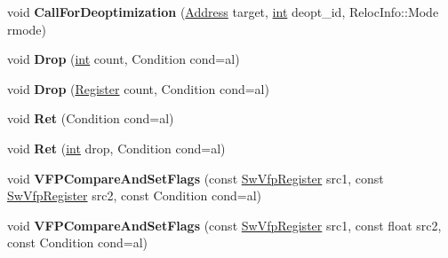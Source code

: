 \begin{DoxyCompactItemize}
\mbox{\label{classv8_1_1internal_1_1TurboAssembler_a8fe9aeaba65f21a5f48bbf9ad66fa18d}} 
void {\bfseries Call\+For\+Deoptimization} (\mbox{\hyperlink{classuintptr__t}{Address}} target, \mbox{\hyperlink{classint}{int}} deopt\+\_\+id, Reloc\+Info\+::\+Mode rmode)
\item 
\mbox{\label{classv8_1_1internal_1_1TurboAssembler_a4eed555cf6760d468febbb6768735945}} 
void {\bfseries Drop} (\mbox{\hyperlink{classint}{int}} count, Condition cond=al)
\item 
\mbox{\label{classv8_1_1internal_1_1TurboAssembler_acbb1403d5c730fde06924e028bdc37ab}} 
void {\bfseries Drop} (\mbox{\hyperlink{classv8_1_1internal_1_1Register}{Register}} count, Condition cond=al)
\item 
\mbox{\label{classv8_1_1internal_1_1TurboAssembler_a04ed6b0bb5c77c06042c60984db0e8a5}} 
void {\bfseries Ret} (Condition cond=al)
\item 
\mbox{\label{classv8_1_1internal_1_1TurboAssembler_a20df85fb80a582d7ff654bd02c3831ba}} 
void {\bfseries Ret} (\mbox{\hyperlink{classint}{int}} drop, Condition cond=al)
\item 
\mbox{\label{classv8_1_1internal_1_1TurboAssembler_a2254663a8d03c43de8286b3490ec120c}} 
void {\bfseries V\+F\+P\+Compare\+And\+Set\+Flags} (const \mbox{\hyperlink{classv8_1_1internal_1_1SwVfpRegister}{Sw\+Vfp\+Register}} src1, const \mbox{\hyperlink{classv8_1_1internal_1_1SwVfpRegister}{Sw\+Vfp\+Register}} src2, const Condition cond=al)
\item 
\mbox{\label{classv8_1_1internal_1_1TurboAssembler_a7022ca0e1396cf71b920e21ecc430d32}} 
void {\bfseries V\+F\+P\+Compare\+And\+Set\+Flags} (const \mbox{\hyperlink{classv8_1_1internal_1_1SwVfpRegister}{Sw\+Vfp\+Register}} src1, const float src2, const Condition cond=al)
\item 
\mbox{\label{classv8_1_1internal_1_1TurboAssembler_aee835426ad318ac84e5a86efe8ef4c0e}} 

\end{DoxyCompactItemize}
